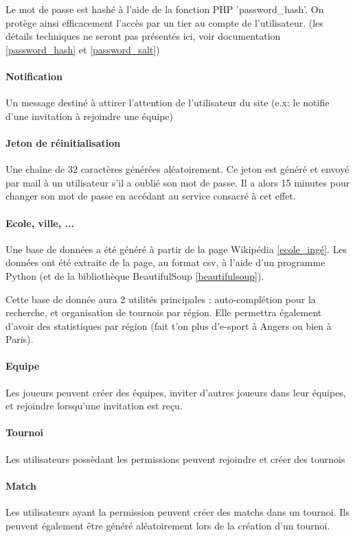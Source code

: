 \documentclass[10pt]{article}
\begin{document}
	Le mot de passe est hashé à l'aide de la fonction PHP 'password\_hash'.
	On protège ainsi efficacement l'accès par un tier au compte de l'utilisateur.
	(les détails techniques ne seront pas présentés ici, voir documentation \ref{password_hash} et \ref{password_salt})
	
	\paragraph{Notification} Un message destiné à attirer l'attention de l'utilisateur du site (e.x: le notifie d'une invitation à rejoindre une équipe)
	\paragraph{Jeton de réinitialisation} Une chaîne de 32 caractères générées aléatoirement.
	  Ce jeton est généré et envoyé par mail à un utilisateur s'il a oublié son mot de passe.
	  Il a alors 15 minutes pour changer son mot de passe en accédant au service consacré à cet effet.
      
	\paragraph{Ecole, ville, ...} 
	  Une base de données a été généré à partir de la page Wikipédia \ref{ecole_ingé}.
	  Les données ont été extraite de la page, au format csv, à l'aide d'un programme Python (et de la bibliothèque BeautifulSoup \ref{beautifulsoup}).
	
	  Cette base de donnée aura 2 utilités principales : auto-complétion pour la recherche, et organisation de tournois par région.
	  Elle permettra également d'avoir des statistiques par région (fait t'on plus d'e-sport à Angers ou bien à Paris).
	
	\paragraph{Equipe} Les joueurs peuvent créer des équipes, inviter d'autres joueurs dans leur équipes, et rejoindre lorsqu'une invitation est reçu.
	\paragraph{Tournoi} Les utilisateurs possèdant les permissions peuvent rejoindre et créer des tournois
	\paragraph{Match} Les utilisateurs ayant la permission peuvent créer des matchs dans un tournoi.
	  Ils peuvent également être généré aléatoirement lors de la création d'un tournoi.	
      \newpage
\end{document}
